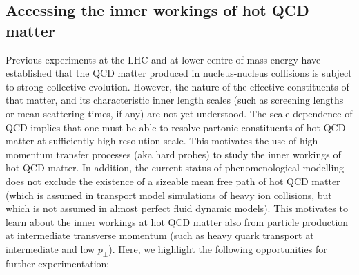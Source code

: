 \documentclass[../report.tex]{subfiles}
\begin{document}
\subsection{Accessing the inner workings of hot QCD matter}
Previous experiments at the LHC and at lower centre of mass energy have established that the QCD matter produced in nucleus-nucleus collisions is subject to strong collective evolution. However, the nature of the effective constituents of that matter, and its characteristic inner length scales (such as screening lengths or mean scattering times, if any) are not yet understood. The scale dependence of QCD implies that one must be able to resolve partonic constituents of hot QCD matter at sufficiently high resolution scale. This motivates the use of high-momentum transfer processes (aka hard probes) to study the inner workings of hot QCD matter. In addition, the current status of phenomenological modelling does not exclude the existence of a sizeable mean free path of hot QCD matter (which is assumed in transport model simulations of heavy ion collisions, but which is not assumed in almost perfect fluid dynamic models). This motivates to learn about the inner workings at hot QCD matter also from particle production at intermediate transverse momentum (such as heavy quark transport at intermediate and low $p_\perp$). Here, we highlight the following opportunities for further experimentation:
\end{document}
